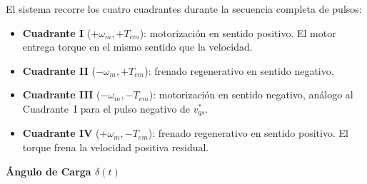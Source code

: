 \documentclass[12pt, a4paper,journal, onecolumn, compsoc]{IEEEtran}
\begin{document}
El sistema recorre los cuatro cuadrantes durante la secuencia completa de pulsos:
\begin{itemize}
    \item \textbf{Cuadrante I} ($+\omega_m, +T_{em}$): motorización en sentido positivo. El motor entrega torque en el mismo sentido que la velocidad.
    \item \textbf{Cuadrante II} ($-\omega_m, +T_{em}$): frenado regenerativo en sentido negativo.
    \item \textbf{Cuadrante III} ($-\omega_m, -T_{em}$): motorización en sentido negativo, análogo al Cuadrante~I para el pulso negativo de $v_{qs}^*$.
    \item \textbf{Cuadrante IV} ($+\omega_m, -T_{em}$): frenado regenerativo en sentido positivo. El torque frena la velocidad positiva residual.
\end{itemize}


\textbf{Ángulo de Carga $\delta(t)$}
\end{document}

